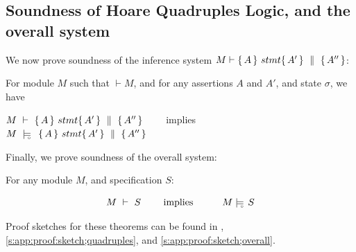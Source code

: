   



\subsection{ Soundness of Hoare Quadruples Logic, and the overall system}
\label{sect:prove:sound:quadruples}
We now prove soundness of the inference system $M \vdash   \{\, A \, \}\ stmt \{\, A' \, \} \, \,\parallel\,\, \{\, A'' \, \} $:


\begin{theorem}
\label{t:quadruple:sound}
For module  $M$ %
such that  $\vdash M$, and for any assertions $A$ and $A'$, and state  $\sigma$, we have

\begin{center}
$M\ \vdash\   \{\, A \, \}\ stmt \{\, A' \, \} \, \,\parallel\,\, \{\, A'' \, \} $ \ \ \ \ implies \ \ \ \ $M\ \modelsD\  \quadruple {A} {stmt} {A'} {A''}$
\end{center}

\end{theorem}

\label{sect:prove:triples:overall}
\noindent
Finally, we  prove soundness of the overall system:

\begin{theorem}[Soundness]
\label{thm:soundness}
 For any module $M$, and specification $S$:
 
 $$\proves{M}{S}\ \ \ \ \ \ \ \mbox{implies}\ \ \ \ \ \  \ \ \ {M} \modelsD {S}$$
\end{theorem}

Proof sketches for these theorems can be found in \A, \ref{s:app:proof:sketch;quadruples}, and \ref{s:app:proof:sketch;overall}. 

%
